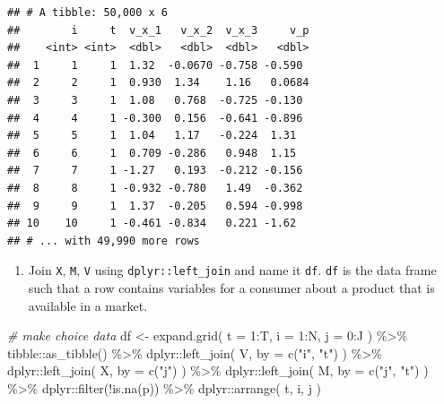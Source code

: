 \documentclass[
]{book}
\newenvironment{Shaded}{\begin{snugshade}}{\end{snugshade}}
\newcommand{\AttributeTok}[1]{\textcolor[rgb]{0.77,0.63,0.00}{#1}}
\newcommand{\CommentTok}[1]{\textcolor[rgb]{0.56,0.35,0.01}{\textit{#1}}}
\newcommand{\DecValTok}[1]{\textcolor[rgb]{0.00,0.00,0.81}{#1}}
\newcommand{\FunctionTok}[1]{\textcolor[rgb]{0.00,0.00,0.00}{#1}}
\newcommand{\NormalTok}[1]{#1}
\newcommand{\OtherTok}[1]{\textcolor[rgb]{0.56,0.35,0.01}{#1}}
\newcommand{\SpecialCharTok}[1]{\textcolor[rgb]{0.00,0.00,0.00}{#1}}
\newcommand{\StringTok}[1]{\textcolor[rgb]{0.31,0.60,0.02}{#1}}
\providecommand{\tightlist}{%
  \setlength{\itemsep}{0pt}\setlength{\parskip}{0pt}}
\begin{document}
\begin{verbatim}
## # A tibble: 50,000 x 6
##        i     t  v_x_1   v_x_2  v_x_3     v_p
##    <int> <int>  <dbl>   <dbl>  <dbl>   <dbl>
##  1     1     1  1.32  -0.0670 -0.758 -0.590 
##  2     2     1  0.930  1.34    1.16   0.0684
##  3     3     1  1.08   0.768  -0.725 -0.130 
##  4     4     1 -0.300  0.156  -0.641 -0.896 
##  5     5     1  1.04   1.17   -0.224  1.31  
##  6     6     1  0.709 -0.286   0.948  1.15  
##  7     7     1 -1.27   0.193  -0.212 -0.156 
##  8     8     1 -0.932 -0.780   1.49  -0.362 
##  9     9     1  1.37  -0.205   0.594 -0.998 
## 10    10     1 -0.461 -0.834   0.221 -1.62  
## # ... with 49,990 more rows
\end{verbatim}

\begin{enumerate}
\def\labelenumi{\arabic{enumi}.}
\setcounter{enumi}{4}
\tightlist
\item
  Join \texttt{X}, \texttt{M}, \texttt{V} using \texttt{dplyr::left\_join} and name it \texttt{df}. \texttt{df} is the data frame such that a row contains variables for a consumer about a product that is available in a market.
\end{enumerate}

\begin{Shaded}
\begin{Highlighting}[]
\CommentTok{\# make choice data}
\NormalTok{df }\OtherTok{\textless{}{-}} 
  \FunctionTok{expand.grid}\NormalTok{(}
    \AttributeTok{t =} \DecValTok{1}\SpecialCharTok{:}\NormalTok{T, }
    \AttributeTok{i =} \DecValTok{1}\SpecialCharTok{:}\NormalTok{N, }
    \AttributeTok{j =} \DecValTok{0}\SpecialCharTok{:}\NormalTok{J}
\NormalTok{    ) }\SpecialCharTok{\%\textgreater{}\%}
\NormalTok{  tibble}\SpecialCharTok{::}\FunctionTok{as\_tibble}\NormalTok{() }\SpecialCharTok{\%\textgreater{}\%}
\NormalTok{  dplyr}\SpecialCharTok{::}\FunctionTok{left\_join}\NormalTok{(}
\NormalTok{    V, }
    \AttributeTok{by =} \FunctionTok{c}\NormalTok{(}\StringTok{"i"}\NormalTok{, }\StringTok{"t"}\NormalTok{)}
\NormalTok{    ) }\SpecialCharTok{\%\textgreater{}\%}
\NormalTok{  dplyr}\SpecialCharTok{::}\FunctionTok{left\_join}\NormalTok{(}
\NormalTok{    X, }
    \AttributeTok{by =} \FunctionTok{c}\NormalTok{(}\StringTok{"j"}\NormalTok{)}
\NormalTok{    ) }\SpecialCharTok{\%\textgreater{}\%}
\NormalTok{  dplyr}\SpecialCharTok{::}\FunctionTok{left\_join}\NormalTok{(}
\NormalTok{    M, }
    \AttributeTok{by =} \FunctionTok{c}\NormalTok{(}\StringTok{"j"}\NormalTok{, }\StringTok{"t"}\NormalTok{)}
\NormalTok{    ) }\SpecialCharTok{\%\textgreater{}\%}
\NormalTok{  dplyr}\SpecialCharTok{::}\FunctionTok{filter}\NormalTok{(}\SpecialCharTok{!}\FunctionTok{is.na}\NormalTok{(p)) }\SpecialCharTok{\%\textgreater{}\%}
\NormalTok{  dplyr}\SpecialCharTok{::}\FunctionTok{arrange}\NormalTok{(}
\NormalTok{    t, }
\NormalTok{    i, }
\NormalTok{    j}
\NormalTok{    )}
\end{Highlighting}
\end{Shaded}
\end{document}
